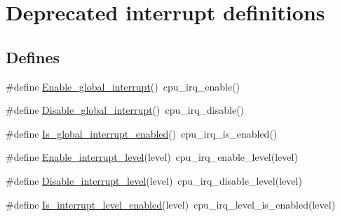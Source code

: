 \hypertarget{group__interrupt__deprecated__group}{
\section{\-Deprecated interrupt definitions}
\label{group__interrupt__deprecated__group}
}
\subsection*{\-Defines}
\begin{DoxyCompactItemize}
\item 
\#define \hyperlink{group__interrupt__deprecated__group_gaebdc47e7800e11d79b9e5e2da1fecaa6}{\-Enable\-\_\-global\-\_\-interrupt}()~cpu\-\_\-irq\-\_\-enable()
\item 
\#define \hyperlink{group__interrupt__deprecated__group_ga4834270e1b8984fe025bce15e7ae1564}{\-Disable\-\_\-global\-\_\-interrupt}()~cpu\-\_\-irq\-\_\-disable()
\item 
\#define \hyperlink{group__interrupt__deprecated__group_gab7b13c60d26b190e73e540586f1868f8}{\-Is\-\_\-global\-\_\-interrupt\-\_\-enabled}()~cpu\-\_\-irq\-\_\-is\-\_\-enabled()
\item 
\#define \hyperlink{group__interrupt__deprecated__group_gaf356f020be969d92c1761afcb98cbc5b}{\-Enable\-\_\-interrupt\-\_\-level}(level)~cpu\-\_\-irq\-\_\-enable\-\_\-level(level)
\item 
\#define \hyperlink{group__interrupt__deprecated__group_ga8bd9b64c87e586fccd12bc168117ec7e}{\-Disable\-\_\-interrupt\-\_\-level}(level)~cpu\-\_\-irq\-\_\-disable\-\_\-level(level)
\item 
\#define \hyperlink{group__interrupt__deprecated__group_ga2da97a4e1ac3493674ecf983dcecaa38}{\-Is\-\_\-interrupt\-\_\-level\-\_\-enabled}(level)~cpu\-\_\-irq\-\_\-level\-\_\-is\-\_\-enabled(level)
\end{DoxyCompactItemize}
